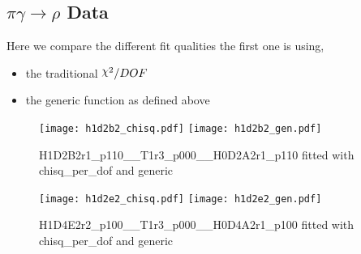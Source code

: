 \documentclass[10pt]{article}
\DeclareRobustCommand{\rchi}{{\mathpalette\irchi\relax}}
\newcommand{\irchi}[2]{\raisebox{\depth}{$#1\chi$}} %
\begin{document}
\subsection{$\pi\gamma \rightarrow \rho $ Data}
Here we compare the different fit qualities the first one is using,
\begin{itemize}
\item the traditional $\rchi^2/DOF$
\item the generic function as defined above
\end{itemize}
\par
\begin{figure}[htp]

\centering
\texttt{[image: h1d2b2\_chisq.pdf]}\hfill
\texttt{[image: h1d2b2\_gen.pdf]}

\caption{{\myfont H1D2B2r1_p110__T1r3_p000__H0D2A2r1_p110} fitted with  {\myfont chisq_per_dof and generic} }
\label{fig:figure1}

\end{figure}
\begin{figure}[htp]

\centering
\texttt{[image: h1d2e2\_chisq.pdf]}\hfill
\texttt{[image: h1d2e2\_gen.pdf]}

\caption{{\myfont H1D4E2r2_p100__T1r3_p000__H0D4A2r1_p100} fitted with  {\myfont chisq_per_dof and generic} }
\label{fig:figure2}

\end{figure}






\end{document}

